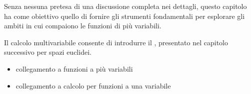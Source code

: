 \documentclass[letterpaper,10pt,italian]{jupyterBook}
\begin{document}
\sphinxAtStartPar
Senza nessuna pretesa di una discussione completa nei dettagli, questo capitolo ha come obiettivo quello di fornire gli strumenti fondamentali per esplorare gli ambiti in cui compaiono le funzioni di più variabili.  

\sphinxAtStartPar
Il calcolo multi\sphinxhyphen{}variabile consente di introdurre il {\hyperref[\detokenize{ch/vector-calculus::doc}]{}}, presentato nel capitolo successivo per spazi euclidei.

\sphinxAtStartPar
{}
\begin{itemize}
\item {} 
\sphinxAtStartPar
collegamento a funzioni a più variabili

\item {} 
\sphinxAtStartPar
collegamento a calcolo per funzioni a una variabile

\end{itemize}
\end{document}
